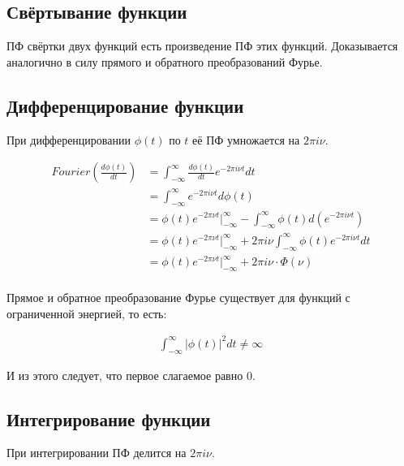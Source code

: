 \documentclass[10pt,a4paper,oneside]{article}
\begin{document}
\subsection{Свёртывание функции}

ПФ свёртки двух функций есть произведение ПФ этих функций. Доказывается аналогично в силу  прямого и обратного преобразований Фурье.

\subsection{Дифференцирование функции}

При дифференцировании $\phi(t)$ по $t$ её ПФ умножается на $2\pi i \nu$.

\[
    \begin{aligned}
        Fourier\left(\frac{d\phi(t)}{dt}\right) 
        &= \int_{-\infty}^{\infty} \frac{d\phi(t)}{dt} e^{-2\pi i\nu t} dt \\
        &= \int_{-\infty}^{\infty} e^{-2\pi i\nu t} d\phi(t) \\
        &= \phi(t) e^{-2\pi\nu t} \bigg|_{-\infty}^{\infty} - \int_{-\infty}^{\infty} \phi(t) d\left(e^{-2\pi i\nu t}\right) \\
        &= \phi(t) e^{-2\pi\nu t} \bigg|_{-\infty}^{\infty} + 2\pi i\nu \int_{-\infty}^{\infty} \phi(t) e^{-2\pi i\nu t} dt \\
        &= \phi(t) e^{-2\pi\nu t} \bigg|_{-\infty}^{\infty} + 2\pi i\nu \cdot \Phi(\nu) \\
    \end{aligned}
\]

Прямое и обратное преобразование Фурье существует для функций с ограниченной энергией, то есть:

\[
    \begin{aligned}
        \int_{-\infty}^{\infty} |\phi(t)|^2 dt \neq \infty
    \end{aligned}
\]

И из этого следует, что первое слагаемое равно 0.

\subsection{Интегрирование функции}

При интегрировании ПФ делится на $2\pi i \nu$.
\end{document}

